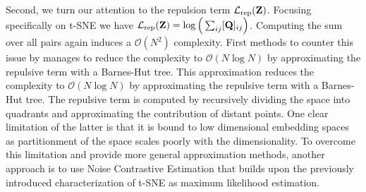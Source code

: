 Second, we turn our attention to the repulsion term $\mathcal{L}_{\mathrm{rep}}({\mathbf{Z}})$. Focusing specifically on t-SNE we have $\mathcal{L}_{\mathrm{rep}}({\mathbf{Z}}) = \log \Big(\sum_{ij} [{\mathbf{Q}}]_{ij} \Big)$. Computing the sum over all pairs again induces a $\mathcal{O}(N^2)$ complexity. First methods to counter this issue by \cite{van2014accelerating} manages to reduce the complexity to $\mathcal{O}(N \log N)$ by approximating the repulsive term with a Barnes-Hut tree. This approximation reduces the complexity to $\mathcal{O}(N \log N)$ by approximating the repulsive term with a Barnes-Hut tree. The repulsive term is computed by recursively dividing the space into quadrants and approximating the contribution of distant points. One clear limitation of the latter is that it is bound to low dimensional embedding spaces as partitionment of the space scales poorly with the dimensionality. To overcome this limitation and provide more general approximation methods, another approach is to use Noise Contrastive Estimation \citep{gutmann2010noise} that builds upon the previously introduced characterization of t-SNE as maximum likelihood estimation.

